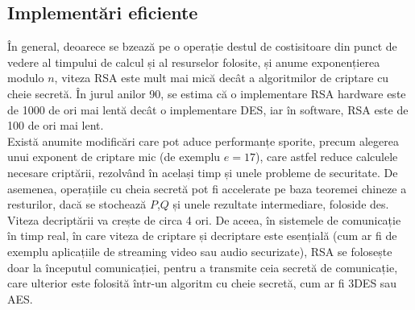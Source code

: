 \documentclass[12pt, oneside]{book}
\begin{document}
\subsection{Implementări eficiente}
În general, deoarece se bzează pe o operație destul de costisitoare din punct de vedere al timpului de calcul și al resurselor folosite, și anume exponențierea modulo $n$, viteza RSA este mult mai mică decât a algoritmilor de criptare cu cheie secretă. În jurul anilor 90, se estima că o implementare RSA hardware este de 1000 de ori mai lentă decât o implementare DES, iar în software, RSA este de 100 de ori mai lent. \\
Există anumite modificări care pot aduce performanțe sporite, precum alegerea unui exponent de criptare mic (de exemplu $e=17$), care astfel reduce calculele necesare criptării, rezolvând în același timp și unele probleme de securitate. De asemenea, operațiile cu cheia secretă pot fi accelerate pe baza teoremei chineze a resturilor, dacă se stochează $P$,$Q$ și unele rezultate intermediare, foloside des.  Viteza decriptării va crește de circa 4 ori. De aceea, în sistemele de comunicație în timp real, în care viteza de criptare și decriptare este esențială (cum ar fi de exemplu aplicațiile de streaming video sau audio securizate), RSA se folosește doar la începutul comunicației, pentru a transmite ceia secretă de comunicație, care ulterior este folosită într-un algoritm cu cheie secretă, cum ar fi 3DES sau AES.
\end{document}
